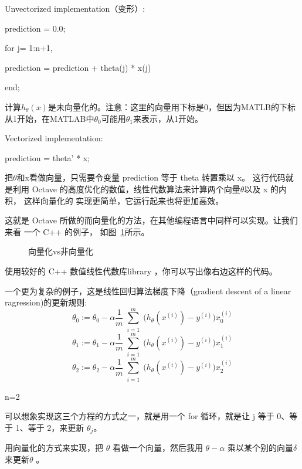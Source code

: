 \documentclass[UTF8]{ctexart}
\begin{document}
Unvectorized implementation（变形）:

prediction = 0.0;

for j= 1:n+1,

    prediction = prediction + theta(j) * x(j)

end;

计算$h_{\theta}(x)$是未向量化的。注意：这里的向量用下标是0，但因为MATLB的下标
从1开始，在MATLAB中$\theta_{0}$可能用$\theta_{1}$来表示，从1开始。
\newline

Vectorized implementation:

prediction = theta' * x;

把$\theta$和x看做向量，只需要令变量 prediction 等于 theta 转置乘以 x。
这行代码就是利用 Octave 的高度优化的数值，线性代数算法来计算两个向量$\theta$以及 x 的内积，
这样向量化的 实现更简单，它运行起来也将更加高效。

这就是 Octave 所做的而向量化的方法，在其他编程语言中同样可以实现。让我们来看 一个 C++ 的例子，
如图~\ref{fig:42}所示。
\begin{figure}[H]
 \caption{向量化vs非向量化}
 \label{fig:42}
\end{figure}

使用较好的 C++ 数值线性代数库library ，你可以写出像右边这样的代码。

一个更为复杂的例子，这是线性回归算法梯度下降（gradient descent of a linear ragression)的更新规则:
\begin{equation*}
  \theta_0 := \theta_0 - \alpha
  \frac{1}{m}
  \sum^m_{\substack{i=1}}
   \Big(h_\theta(x^{(i)})-y^{(i)}\Big)x_{0}^{(i)}
\end{equation*}
\begin{equation*}
   \theta_1 := \theta_1 - \alpha
   \frac{1}{m}
   \sum^m_{\substack{i=1}}
    \Big(h_\theta(x^{(i)})-y^{(i)}\Big)x_{1}^{(i)}
\end{equation*}
\begin{equation*}
  \theta_2 := \theta_2 - \alpha
  \frac{1}{m}
  \sum^m_{\substack{i=1}}
   \Big(h_\theta(x^{(i)})-y^{(i)}\Big)x_{2}^{(i)}
\end{equation*}

n=2

可以想象实现这三个方程的方式之一，就是用一个 for 循环，就是让 j 等于 0、等于 1、等于 2，来更新 $\theta_{j}$。

用向量化的方式来实现，把 $\theta$ 看做一个向量，然后我用 $\theta-\alpha$ 乘以某个别的向量$\delta$ 来更新$\theta$ 。
\end{document}
